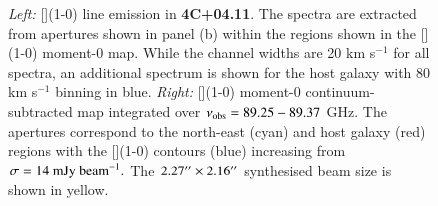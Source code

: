 \begin{figure}
\hspace*{-50pt}
\centering
\caption[{4C+04.11 [](1-0) line spectra and moment-0 maps}]{{\it Left:} [](1-0) line emission in {\bf 4C+04.11}. The spectra are extracted from apertures shown in panel (b) within the regions shown in the [](1-0) moment-0 map. While the channel widths are 20 km s$^{-1}$ for all spectra, an additional spectrum is shown for the host galaxy with 80 km s$^{-1}$ binning in blue. {\it Right:} [](1-0) moment-0 continuum-subtracted map integrated over $\nu_{\rm obs}=89.25 - 89.37$ GHz. The apertures correspond to the north-east (cyan) and host galaxy (red) regions with the [](1-0) contours (blue) increasing from $\sigma = 14~\rm{mJy~beam}^{-1}.$ The $2.27^{\prime\prime} \times 2.16^{\prime\prime}$ synthesised beam size is shown in yellow.}
\label{fig:4C04-fit-CI-moment0}
\end{figure}

